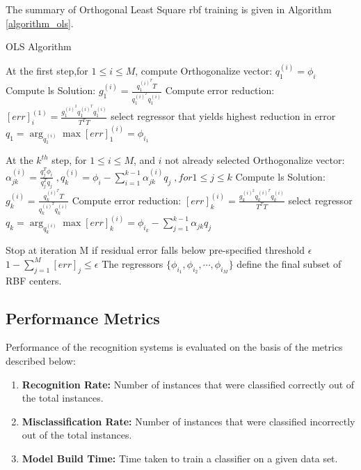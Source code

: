 The summary of Orthogonal Least Square \ac{rbf} training \cite{Chen1991} is given in Algorithm \ref{algorithm_ols}.

\begin{algorithm}
\caption{OLS Algorithm}
\label{algorithm_ols}
\begin{algorithmic}[1]
\STATE At the first step,for $1\le i\le M$, compute
\STATE \qquad\qquad Orthogonalize vector: $q^{(i)}_1=\phi_i$
\STATE \qquad\qquad Compute \ac{ls} Solution:	$g^{(i)}_1=\frac{q^{{(i)}^T}_1T}{q^{{(i)}^T}_1q^{(i)}_1}$
\STATE \qquad\qquad Compute error reduction: $[err]^{(1)}_i=\frac{g^{{(i)}^2}_1q^{{(i)}^T}_1q^{(i)}_1}{T^TT}$
\STATE \quad select regressor that yields highest reduction in error $q_1=\arg_{q^{(i)}_1}\max[err]^{(i)}_1=\phi_{i_1}$


\STATE At the $k^{th}$ step, for $1\le i\le M$, and $i$ not already selected
\STATE \qquad\qquad Orthogonalize vector: $\alpha^{(i)}_{jk}=\frac{q^T_j\phi_i}{q^T_jq_j} \;, q^{(i)}_k=\phi_i-\sum\limits_{i=1}^{k-1}\alpha^{(i)}_{jk}q_j \;, for 1\le j \le k $
\STATE \qquad\qquad Compute \ac{ls} Solution:	$g^{(i)}_k=\frac{q^{{(i)}^T}_kT}{q^{{(i)}^T}_kq^{(i)}_k}$
\STATE \qquad\qquad Compute error reduction: $[err]^{(i)}_k=\frac{g^{{(i)}^2}_kq^{{(i)}^T}_kq^{(i)}_k}{T^TT}$
\STATE \quad select regressor $q_k=\arg_{q^{(i)}_k}\max[err]^{(i)}_k=\phi_{i_k}-\sum\limits_{j=1}^{k-1}\alpha_{jk}q_j$

\STATE Stop at iteration M if residual error falls below pre-specified threshold $\epsilon$
\STATE \qquad\qquad\qquad $1- \sum\limits_{j=1}^{M}[err]_j \le \epsilon $
\STATE The regressors $\lbrace{\phi_{i_1},\phi_{i_2},\cdots,\phi_{i_M}}\rbrace$ define the final subset of RBF centers.
\end{algorithmic}
\end{algorithm}

\subsection{Performance Metrics}
Performance of the recognition systems is evaluated on the basis of the metrics described below:
\begin{enumerate}
\itemsep0em
\item \textbf{Recognition Rate:} Number of instances that were classified correctly out of the total instances.
\item \textbf{Misclassification Rate:} Number of instances that were classified incorrectly out of the total instances.
\item \textbf{Model Build Time:} Time taken to train a classifier on a given data set.
\end{enumerate}

